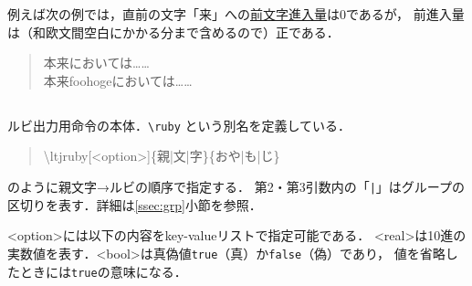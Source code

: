 \documentclass[a4paper,10ptj]{ltjsarticle}
\def\cs#1{\eghostguarded{\texttt{\textbackslash#1}}}
\begin{document}
例えば次の例では，直前の文字「来」への\underline{前文字進入量}は0であるが，
前進入量は（和欧文間空白にかかる分まで含めるので）正である．
\begin{quote}
  \Large
  本来においては……\\
  本来foohogeにおいては……
\end{quote}

\subsection{}
\paragraph{\cs{ltjruby}}
ルビ出力用命令の本体．\verb+\ruby+ という別名を定義している．
\begin{quote}
\ttfamily \textbackslash ltjruby[<option>]\{親|文|字\}\{おや|も|じ\}
\end{quote}
のように親文字→ルビの順序で指定する．
第2・第3引数内の「\verb+|+」はグループの区切りを表す．詳細は\ref{ssec:grp}\nobreak 小節を参照．

\medskip
<option>には以下の内容をkey-valueリストで指定可能である．
<real>は10進の実数値を表す．<bool>は真偽値\texttt{true}（真）か\texttt{false}（偽）であり，
値を省略したときには\texttt{true}の意味になる．
\end{document}
